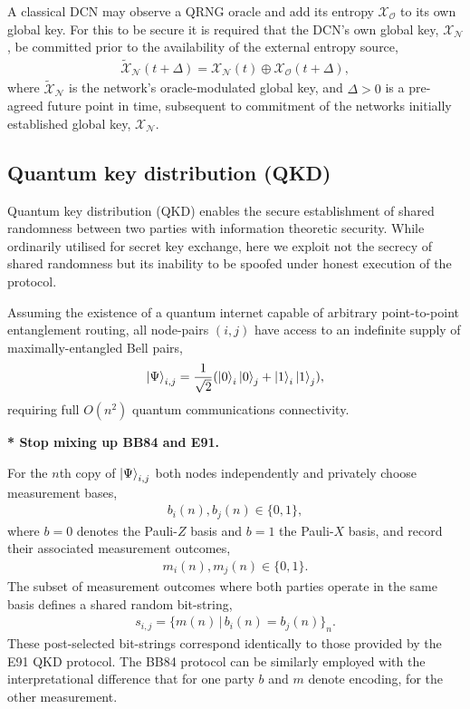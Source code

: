 \documentclass[twocolumn, aps, amsmath, amssymb, nofootinbib, superscriptaddress, longbibliography, floatfix, eqsecnum, rmp]{revtex4-2}
\begin{document}
A classical DCN may observe a QRNG oracle and add its entropy $\mathcal{X}_\mathcal{O}$ to its own global key. For this to be secure it is required that the DCN's own global key, $\mathcal{X}_\mathcal{N}$, be committed prior to the availability of the external entropy source,
\begin{align}
	{\mathcal{\tilde X}}_\mathcal{N}(t+\Delta) = \mathcal{X}_\mathcal{N}(t) \oplus \mathcal{X}_\mathcal{O}(t+\Delta),	
\end{align}
where ${\mathcal{\tilde X}}_\mathcal{N}$ is the network's oracle-modulated global key, and \mbox{$\Delta>0$} is a pre-agreed future point in time, subsequent to commitment of the networks initially established global key, $\mathcal{X}_\mathcal{N}$.

\subsection{Quantum key distribution (QKD)} \label{sec:QKD}

Quantum key distribution (QKD) \cite{BB84, E91} enables the secure establishment of shared randomness between two parties with information theoretic security. While ordinarily utilised for secret key exchange, here we exploit not the secrecy of shared randomness but its inability to be spoofed under honest execution of the protocol.

Assuming the existence of a quantum internet \cite{RohdeQI} capable of arbitrary point-to-point entanglement routing, all node-pairs $(i,j)$ have access to an indefinite supply of maximally-entangled Bell pairs,
\begin{align}
	\ket{\Psi}_{i,j} = \frac{1}{\sqrt{2}}(\ket{0}_i\ket{0}_j+\ket{1}_i\ket{1}_j),
\end{align}
requiring full $O(n^2)$ quantum communications connectivity.

\textbf{* Stop mixing up BB84 and E91.}

For the $n$th copy of $\ket{\Psi}_{i,j}$ both nodes independently and privately choose measurement bases,
\begin{align}
	b_i(n),b_j(n)\in\{0,1\},
\end{align}
where \mbox{$b=0$} denotes the Pauli-$Z$ basis and $b=1$ the Pauli-$X$ basis, and record their associated measurement outcomes, 
\begin{align}
	m_i(n),m_j(n)\in\{0,1\}.
\end{align}
The subset of measurement outcomes where both parties operate in the same basis defines a shared random bit-string,
\begin{align}
	s_{i,j} = \{m(n)\,|\, b_i(n)=b_j(n)\}_n.
\end{align}
These post-selected bit-strings correspond identically to those provided by the E91 \cite{E91} QKD protocol. The BB84 protocol \cite{BB84} can be similarly employed with the interpretational difference that for one party $b$ and $m$ denote encoding, for the other measurement.
\end{document}
